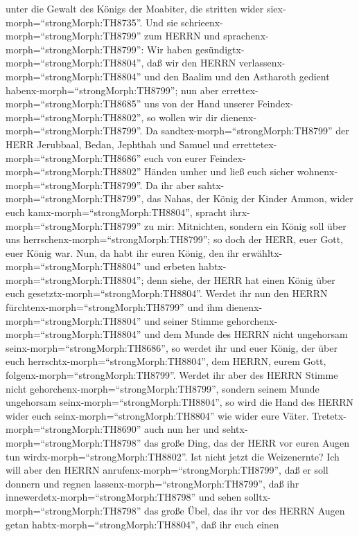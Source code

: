 unter die Gewalt des Königs der Moabiter, die stritten wider
siex-morph=``strongMorph:TH8735''.  Und sie
schrieenx-morph=``strongMorph:TH8799'' zum HERRN und
sprachenx-morph=``strongMorph:TH8799'': Wir haben
gesündigtx-morph=``strongMorph:TH8804'', daß wir den HERRN
verlassenx-morph=``strongMorph:TH8804'' und den Baalim und den Astharoth
gedient habenx-morph=``strongMorph:TH8799''; nun aber
errettex-morph=``strongMorph:TH8685'' uns von der Hand unserer
Feindex-morph=``strongMorph:TH8802'', so wollen wir dir
dienenx-morph=``strongMorph:TH8799''.  Da
sandtex-morph=``strongMorph:TH8799'' der HERR Jerubbaal, Bedan, Jephthah
und Samuel und errettetex-morph=``strongMorph:TH8686'' euch von eurer
Feindex-morph=``strongMorph:TH8802'' Händen umher und ließ euch sicher
wohnenx-morph=``strongMorph:TH8799''.  Da ihr aber
sahtx-morph=``strongMorph:TH8799'', das Nahas, der König der Kinder
Ammon, wider euch kamx-morph=``strongMorph:TH8804'', spracht
ihrx-morph=``strongMorph:TH8799'' zu mir: Mitnichten, sondern ein König
soll über uns herrschenx-morph=``strongMorph:TH8799''; so doch der HERR,
euer Gott, euer König war.  Nun, da habt ihr euren König,
den ihr erwähltx-morph=``strongMorph:TH8804'' und erbeten
habtx-morph=``strongMorph:TH8804''; denn siehe, der HERR hat einen König
über euch gesetztx-morph=``strongMorph:TH8804''.  Werdet
ihr nun den HERRN fürchtenx-morph=``strongMorph:TH8799'' und ihm
dienenx-morph=``strongMorph:TH8804'' und seiner Stimme
gehorchenx-morph=``strongMorph:TH8804'' und dem Munde des HERRN nicht
ungehorsam seinx-morph=``strongMorph:TH8686'', so werdet ihr und euer
König, der über euch herrschtx-morph=``strongMorph:TH8804'', dem HERRN,
eurem Gott, folgenx-morph=``strongMorph:TH8799''.  Werdet
ihr aber des HERRN Stimme nicht gehorchenx-morph=``strongMorph:TH8799'',
sondern seinem Munde ungehorsam seinx-morph=``strongMorph:TH8804'', so
wird die Hand des HERRN wider euch seinx-morph=``strongMorph:TH8804''
wie wider eure Väter.  Tretetx-morph=``strongMorph:TH8690''
auch nun her und sehtx-morph=``strongMorph:TH8798'' das große Ding, das
der HERR vor euren Augen tun wirdx-morph=``strongMorph:TH8802''.
 Ist nicht jetzt die Weizenernte? Ich will aber den HERRN
anrufenx-morph=``strongMorph:TH8799'', daß er soll donnern und regnen
lassenx-morph=``strongMorph:TH8799'', daß ihr
innewerdetx-morph=``strongMorph:TH8798'' und sehen
solltx-morph=``strongMorph:TH8798'' das große Übel, das ihr vor des
HERRN Augen getan habtx-morph=``strongMorph:TH8804'', daß ihr euch einen
